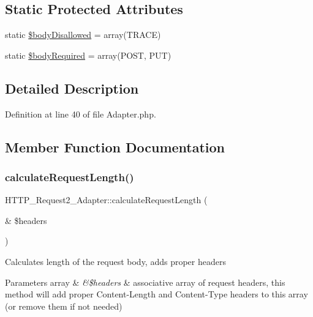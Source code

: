 \subsection*{Static Protected Attributes}
\begin{DoxyCompactItemize}
\item 
static \hyperlink{classHTTP__Request2__Adapter_aff1fdc6f36307d7e6febd29573741d33}{\$body\+Disallowed} = array(\textquotesingle{}T\+R\+A\+CE\textquotesingle{})
\item 
static \hyperlink{classHTTP__Request2__Adapter_a1c84e4f08fed2fdd4511ea12bf479595}{\$body\+Required} = array(\textquotesingle{}P\+O\+ST\textquotesingle{}, \textquotesingle{}P\+UT\textquotesingle{})
\end{DoxyCompactItemize}


\subsection{Detailed Description}


Definition at line 40 of file Adapter.\+php.



\subsection{Member Function Documentation}
\hypertarget{classHTTP__Request2__Adapter_a046d93dce3a7735a7cc0e4564593de5d}{}\label{classHTTP__Request2__Adapter_a046d93dce3a7735a7cc0e4564593de5d} 
\subsubsection{\texorpdfstring{calculate\+Request\+Length()}{calculateRequestLength()}}
{\footnotesize\ttfamily H\+T\+T\+P\+\_\+\+Request2\+\_\+\+Adapter\+::calculate\+Request\+Length (\begin{DoxyParamCaption}\item[{\&}]{\$headers }\end{DoxyParamCaption})\hspace{0.3cm}{\ttfamily [protected]}}

Calculates length of the request body, adds proper headers


\begin{DoxyParams}[1]{Parameters}
array & {\em \&\$headers} & associative array of request headers, this method will add proper \textquotesingle{}Content-\/\+Length\textquotesingle{} and \textquotesingle{}Content-\/\+Type\textquotesingle{} headers to this array (or remove them if not needed) \\
\hline
\end{DoxyParams}



